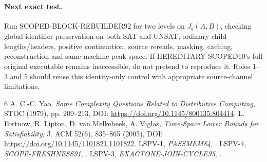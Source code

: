 \documentclass[11pt]{article}
\begin{document}
\paragraph{Next exact test.}
Run SCOPED-BLOCK-REBUILDER92 for two levels on $J_q(A,B)$, checking global identifier preservation on both SAT and UNSAT, ordinary child lengths/headers, positive continuation, source rereads, masking, caching, reconstruction and same-machine peak space. If HEREDITARY-SCOPED10's full original executable remains inaccessible, do not pretend to reproduce it. Roles 1--3 and 5 should reuse this identity-only control with appropriate source-channel limitations.

\begin{thebibliography}{6}
 A. C.-C. Yao, \emph{Some Complexity Questions Related to Distributive Computing}, STOC (1979), pp. 209--213, DOI: \url{https://doi.org/10.1145/800135.804414}.
 L. Fortnow, R. Lipton, D. van Melkebeek, A. Viglas, \emph{Time-Space Lower Bounds for Satisfiability}, J. ACM 52(6), 835--865 (2005), DOI: \url{https://doi.org/10.1145/1101821.1101822}.
 LSPV-1, \emph{PASSMEM84}, .
 LSPV-4, \emph{SCOPE-FRESHNESS91}, .
 LSPV-3, \emph{EXACTONE-JOIN-CYCLE95}, .
\end{thebibliography}
\end{document}
